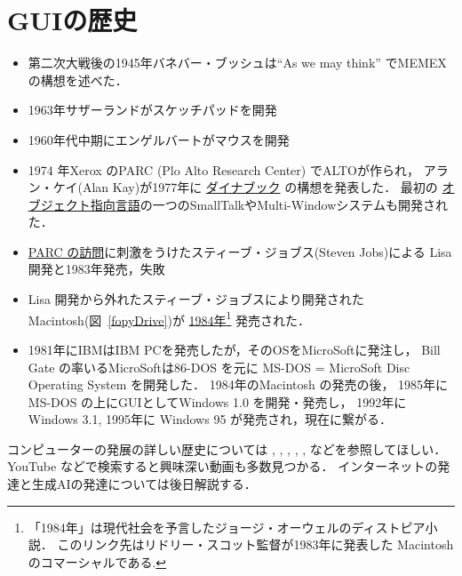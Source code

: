 \section{GUIの歴史}\label{GUI}
\begin{itemize}
   \item 
   第二次大戦後の1945年バネバー・ブッシュは``As we may think'' でMEMEX の構想を述べた．
   
   \item 
      1963年サザーランドがスケッチパッドを開発
   \item 
      1960年代中期にエンゲルバートがマウスを開発
   \item 
      1974 年Xerox のPARC (Plo Alto Research Center) でALTOが作られ，
      アラン・ケイ(Alan Kay)が1977年に
      \href{https://www.youtube.com/watch?v=BNmPQQwE50U}{ダイナブック}
      の構想を発表した．
     最初の \href{https://www.youtube.com/watch?v=H1GJMoZqLdo}
     {オブジェクト指向言語}の一つのSmallTalkやMulti-Windowシステムも開発された．
   
   \item
      \href{https://www.youtube.com/watch?v=pQocN_c2uLI}{PARC の訪問}に刺激をうけたスティーブ・ジョブス(Steven Jobs)による
      Lisa 開発と1983年発売，失敗
   
   \item 
            Lisa 開発から外れたスティーブ・ジョブスにより開発された
      Macintosh(図~\ref{fopyDrive})が
      \href{https://www.youtube.com/watch?v=ErwS24cBZPc}{1984年}\footnote{「1984年」は現代社会を予言したジョージ・オーウェルのディストピア小説\cite{Orwell}．
         このリンク先はリドリー・スコット監督が1983年に発表した Macintosh のコマーシャルである\cite{Jobs}. 
      }
      発売された．
      
   \item
       1981年にIBMはIBM PCを発売したが，そのOSをMicroSoftに発注し，
      Bill Gate の率いるMicroSoftは86-DOS を元に
      MS-DOS  = MicroSoft Disc Operating System を開発した．
      1984年のMacintosh の発売の後， 
      1985年にMS-DOS の上にGUIとしてWindows 1.0 を開発・発売し，
      1992年に Windows 3.1, 1995年に Windows 95 が発売され，現在に繋がる．

   
\end{itemize}
コンピューターの発展の詳しい歴史については \cite{Jobs}, \cite{interface}, \cite{history}, \cite{UNIX}, \cite{Kay}, \cite{tools} などを参照してほしい．YouTube などで検索すると興味深い動画も多数見つかる．
インターネットの発達と生成AIの発達については後日解説する．

